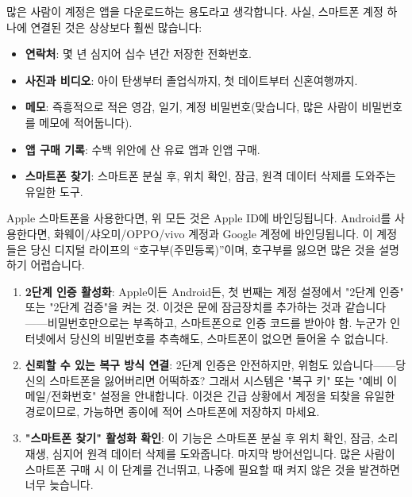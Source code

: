 


많은 사람이 계정은 앱을 다운로드하는 용도라고 생각합니다. 사실, 스마트폰 계정 하나에 연결된 것은 상상보다 훨씬 많습니다:

\begin{itemize}
  \item \textbf{연락처}: 몇 년 심지어 십수 년간 저장한 전화번호.
  \item \textbf{사진과 비디오}: 아이 탄생부터 졸업식까지, 첫 데이트부터 신혼여행까지.
  \item \textbf{메모}: 즉흥적으로 적은 영감, 일기, 계정 비밀번호(맞습니다, 많은 사람이 비밀번호를 메모에 적어둡니다).
  \item \textbf{앱 구매 기록}: 수백 위안에 산 유료 앱과 인앱 구매.
  \item \textbf{스마트폰 찾기}: 스마트폰 분실 후, 위치 확인, 잠금, 원격 데이터 삭제를 도와주는 유일한 도구.
\end{itemize}

Apple 스마트폰을 사용한다면, 위 모든 것은 Apple ID에 바인딩됩니다. Android를 사용한다면, 화웨이/샤오미/OPPO/vivo 계정과 Google 계정에 바인딩됩니다. 이 계정들은 당신 디지털 라이프의 “호구부(주민등록)”이며, 호구부를 잃으면 많은 것을 설명하기 어렵습니다.


\begin{enumerate}
  \item \textbf{2단계 인증 활성화}: Apple이든 Android든, 첫 번째는 계정 설정에서 "2단계 인증" 또는 "2단계 검증"을 켜는 것. 이것은 문에 잠금장치를 추가하는 것과 같습니다——비밀번호만으로는 부족하고, 스마트폰으로 인증 코드를 받아야 함. 누군가 인터넷에서 당신의 비밀번호를 추측해도, 스마트폰이 없으면 들어올 수 없습니다.
  \item \textbf{신뢰할 수 있는 복구 방식 연결}: 2단계 인증은 안전하지만, 위험도 있습니다——당신의 스마트폰을 잃어버리면 어떡하죠? 그래서 시스템은 "복구 키" 또는 "예비 이메일/전화번호" 설정을 안내합니다. 이것은 긴급 상황에서 계정을 되찾을 유일한 경로이므로, 가능하면 종이에 적어 스마트폰에 저장하지 마세요.
  \item \textbf{"스마트폰 찾기" 활성화 확인}: 이 기능은 스마트폰 분실 후 위치 확인, 잠금, 소리 재생, 심지어 원격 데이터 삭제를 도와줍니다. 마지막 방어선입니다. 많은 사람이 스마트폰 구매 시 이 단계를 건너뛰고, 나중에 필요할 때 켜지 않은 것을 발견하면 너무 늦습니다.
\end{enumerate}

